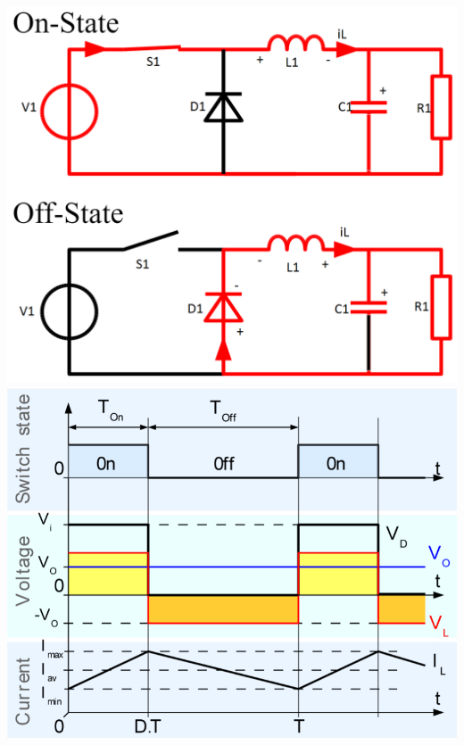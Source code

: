 \begin{minipage}{0.25\linewidth}
    \includegraphics[width=\linewidth]{images/BuckOnOff}
    \includegraphics[width=\linewidth]{images/BuckSwitch}
\end{minipage}
